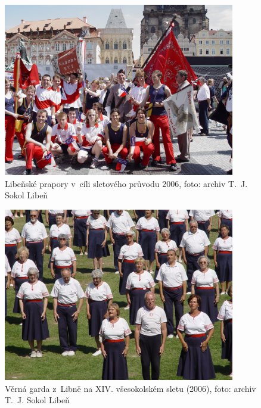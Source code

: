 \documentclass[a5paper, 11pt, twoside]{article}
\begin{document}
\begin{figure}[h]
  \centering 
  \includegraphics[width=0.9\textwidth]{img/53_slet_pruvod.JPG}
  \caption*{Libeňské prapory v~cíli sletového průvodu 2006, foto: archiv T.~J. Sokol Libeň}
\end{figure}

\begin{figure}[h]
  \centering 
  \includegraphics[width=0.9\textwidth]{img/54_garda.JPG}
  \caption*{Věrná garda z~Libně na XIV. všesokolském sletu (2006), foto:
  archiv T.~J. Sokol Libeň}
\end{figure}
\end{document}
